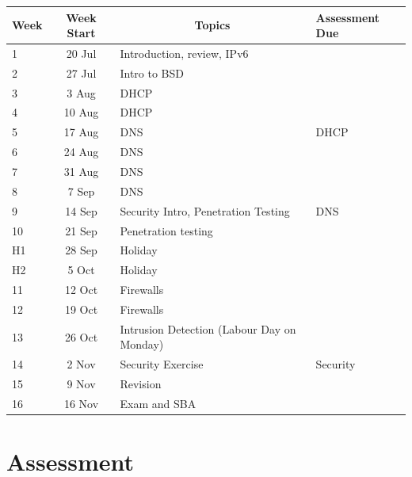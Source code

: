 \documentclass{article}
\begin{document}
\renewcommand{\arraystretch}{1.5}
\begin{tabular}{|l|c|l|l|}
\hline
 Week & Week Start & \multicolumn{1}{c|}{Topics}               & Assessment Due   \\ \hline
 1    & 20 Jul     & Introduction, review, IPv6                &   \\ \hline
 2    & 27 Jul     & Intro to BSD                              &   \\ \hline
 3    &  3 Aug     & DHCP                                      &   \\ \hline
 4    & 10 Aug     & DHCP                                      &   \\ \hline
 5    & 17 Aug     & DNS                                       & DHCP  \\ \hline
 6    & 24 Aug     & DNS                                       &   \\ \hline
 7    & 31 Aug     & DNS                                       &   \\ \hline
 8    &  7 Sep     & DNS                                       &   \\ \hline
 9    & 14 Sep     & Security Intro, Penetration Testing       & DNS  \\ \hline
 10   & 21 Sep     & Penetration testing                       &   \\ \hline
 H1   & 28 Sep     & Holiday                                   &   \\ \hline
 H2   &  5 Oct     & Holiday                                   &   \\ \hline
 11   & 12 Oct     & Firewalls                                 &   \\ \hline
 12   & 19 Oct     & Firewalls                                 &   \\ \hline
 13   & 26 Oct     & Intrusion Detection (Labour Day on Monday)&   \\ \hline
 14   &  2 Nov     & Security Exercise                         & Security  \\ \hline
 15   &  9 Nov     & Revision                                  &   \\ \hline
 16   & 16 Nov     & Exam and SBA                              &   \\ \hline
\end{tabular}

\section*{Assessment}
\end{document}
